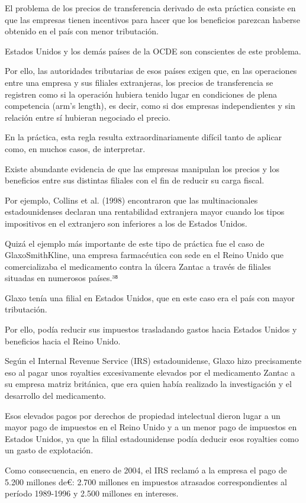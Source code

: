 \documentclass[10pt,a4paper]{article}
\begin{document}
El problema de los precios de transferencia derivado de esta práctica consiste en que las empresas tienen incentivos para hacer que los beneficios parezcan haberse obtenido en el país con menor tributación.

Estados Unidos y los demás países de la OCDE son conscientes de este problema.

Por ello, las autoridades tributarias de esos países exigen que, en las operaciones entre una empresa y sus filiales extranjeras, los precios de transferencia se registren como si la operación hubiera tenido lugar en condiciones de plena competencia (arm’s length), es decir, como si dos empresas independientes y sin relación entre sí hubieran negociado el precio.

En la práctica, esta regla resulta extraordinariamente difícil tanto de aplicar como, en muchos casos, de interpretar.

Existe abundante evidencia de que las empresas manipulan los precios y los beneficios entre sus distintas filiales con el fin de reducir su carga fiscal.

Por ejemplo, Collins et al. (1998) encontraron que las multinacionales estadounidenses declaran una rentabilidad extranjera mayor cuando los tipos impositivos en el extranjero son inferiores a los de Estados Unidos.

Quizá el ejemplo más importante de este tipo de práctica fue el caso de GlaxoSmithKline, una empresa farmacéutica con sede en el Reino Unido que comercializaba el medicamento contra la úlcera Zantac a través de filiales situadas en numerosos países.³⁸

Glaxo tenía una filial en Estados Unidos, que en este caso era el país con mayor tributación.

Por ello, podía reducir sus impuestos trasladando gastos hacia Estados Unidos y beneficios hacia el Reino Unido.

Según el Internal Revenue Service (IRS) estadounidense, Glaxo hizo precisamente eso al pagar unos royalties excesivamente elevados por el medicamento Zantac a su empresa matriz británica, que era quien había realizado la investigación y el desarrollo del medicamento.

Esos elevados pagos por derechos de propiedad intelectual dieron lugar a un mayor pago de impuestos en el Reino Unido y a un menor pago de impuestos en Estados Unidos, ya que la filial estadounidense podía deducir esos royalties como un gasto de explotación.

Como consecuencia, en enero de 2004, el IRS reclamó a la empresa el pago de 5.200 millones de€: 2.700 millones en impuestos atrasados correspondientes al período 1989-1996 y 2.500 millones en intereses.
\end{document}
